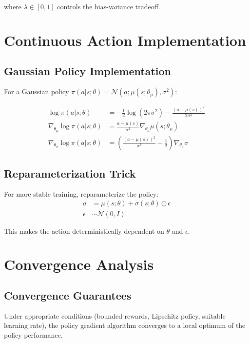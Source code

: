where $\lambda \in [0,1]$ controls the bias-variance tradeoff.

\section{Continuous Action Implementation}

\subsection{Gaussian Policy Implementation}

For a Gaussian policy $\pi(a|s; \theta) = \mathcal{N}(a; \mu(s; \theta_\mu), \sigma^2)$:

\begin{align}
\log \pi(a|s; \theta) &= -\frac{1}{2}\log(2\pi\sigma^2) - \frac{(a - \mu(s))^2}{2\sigma^2} \\
\nabla_{\theta_\mu} \log \pi(a|s; \theta) &= \frac{a - \mu(s)}{\sigma^2} \nabla_{\theta_\mu} \mu(s; \theta_\mu) \\
\nabla_{\theta_\sigma} \log \pi(a|s; \theta) &= \left( \frac{(a - \mu(s))^2}{\sigma^3} - \frac{1}{\sigma} \right) \nabla_{\theta_\sigma} \sigma
\end{align}

\subsection{Reparameterization Trick}

For more stable training, reparameterize the policy:
\begin{align}
a &= \mu(s; \theta) + \sigma(s; \theta) \odot \epsilon \\
\epsilon &\sim \mathcal{N}(0, I)
\end{align}

This makes the action deterministically dependent on $\theta$ and $\epsilon$.

\section{Convergence Analysis}

\subsection{Convergence Guarantees}

\begin{theorem}
Under appropriate conditions (bounded rewards, Lipschitz policy, suitable learning rate), the policy gradient algorithm converges to a local optimum of the policy performance.
\end{theorem}

